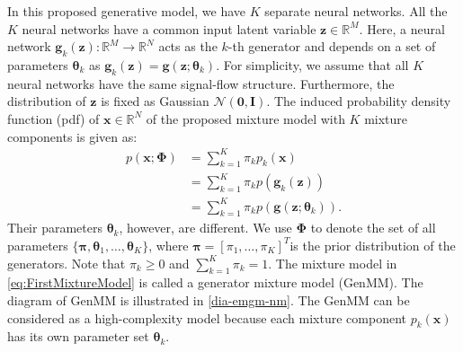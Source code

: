 %   

In this proposed generative model, we have $K$ separate neural networks. All the $K$ neural networks have a common input latent variable $\bm{z} \in \mathbb{R}^M$. Here, a neural network $\bm{g}_k(\bm{z}): \mathbb{R}^M
\rightarrow \mathbb{R}^N$ acts as the $k$-th generator and depends on a set of parameters $\bm{\theta}_k$ as
$\bm{g}_k(\bm{z})=\bm{g}(\bm{z};\boldsymbol{\theta}_k)$. For
simplicity, we assume that all $K$ neural networks have the same
signal-flow structure. Furthermore, the distribution of $\bm{z}$ is fixed as Gaussian $\mathcal{N}(\bm{0},\bm{I})$.
The induced probability density function (pdf) of $\bm{x} \in \mathbb{R}^N$ of the proposed mixture model with $K$ mixture components is given as:
\begin{align}\label{eq:FirstMixtureModel}
  p(\bm{x};\bm{\Phi})  &= \textstyle\sum_{k=1}^K \pi_k  p_k(\bm{x}) \nonumber\\
                       &= \textstyle \sum_{k=1}^K \pi_k  p(\bm{g}_k(\bm{z}))\nonumber\\
                       &= \textstyle \sum_{k=1}^K \pi_k  p(\bm{g}(\bm{z};\boldsymbol{\theta}_k)).
\end{align}
Their parameters $\boldsymbol{\theta}_k$, however,
are different. We use $\bm{\Phi}$ to denote the set of all parameters $ \{\bm{\pi},\bm{\theta}_1, \dots, \bm{\theta}_K \}$, where $\bm{\pi} = \left[\pi_1, \hdots, \pi_K\right]^{T}$is the prior distribution of the generators. Note that $\pi_k \geq 0$ and $\sum_{k=1}^K \pi_k =1$. The mixture model
in \eqref{eq:FirstMixtureModel} is called a generator mixture model (GenMM). The
diagram of GenMM is illustrated in \autoref{dia-emgm-nm}. The GenMM can be considered as a high-complexity model because each mixture component $p_k(\bm{x})$ has its own parameter set $\bm{\theta}_k$. 

